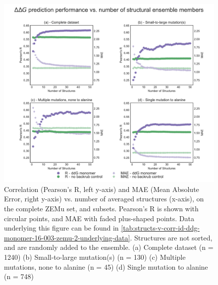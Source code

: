 \begin{figure}
  \includegraphics[width=\textwidth,keepaspectratio]{structs-v-corr-id-ddg-monomer-16-003-zemu-2.pdf}
  \caption[]{ %
    Correlation (Pearson's R, left y-axis) and MAE (Mean Absolute Error, right y-axis) vs. number of averaged structures (x-axis), on the complete ZEMu set, and subsets.
    Pearson's R is shown with circular points, and MAE with faded plus-shaped points.
    Data underlying this figure can be found in \cref{tab:structs-v-corr-id-ddg-monomer-16-003-zemu-2-underlying-data}.
    Structures are not sorted, and are randomly added to the ensemble. 
    (a) Complete dataset (n = 1240)
    (b) Small-to-large mutation(s) (n = 130)
    (c) Multiple mutations, none to alanine (n = 45)
    (d) Single mutation to alanine (n = 748)
  } \label{fig:structs-v-corr-id-ddg-monomer-16-003-zemu-2}
\end{figure}
